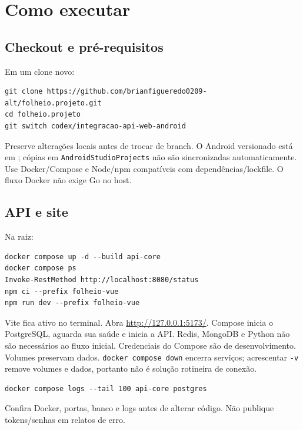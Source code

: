 \documentclass[11pt,a4paper]{article}
\newcommand{\arquivo}[1]{\path{#1}}
\begin{document}
\section{Como executar}\label{sec:executar}
\subsection{Checkout e pré-requisitos}
Em um clone novo:
\begin{lstlisting}
git clone https://github.com/brianfigueredo0209-alt/folheio.projeto.git
cd folheio.projeto
git switch codex/integracao-api-web-android
\end{lstlisting}
Preserve alterações locais antes de trocar de branch. O Android versionado está em \arquivo{folheio-android/}; cópias em \texttt{AndroidStudioProjects} não são sincronizadas automaticamente.
Use Docker/Compose e Node/npm compatíveis com dependências/lockfile. O fluxo Docker não exige Go no host.
\subsection{API e site}
Na raiz:
\begin{lstlisting}
docker compose up -d --build api-core
docker compose ps
Invoke-RestMethod http://localhost:8080/status
npm ci --prefix folheio-vue
npm run dev --prefix folheio-vue
\end{lstlisting}
Vite fica ativo no terminal. Abra \url{http://127.0.0.1:5173/}. Compose inicia o PostgreSQL, aguarda sua saúde e inicia a API. Redis, MongoDB e Python não são necessários ao fluxo inicial.
Credenciais do Compose são de desenvolvimento. Volumes preservam dados. \texttt{docker compose down} encerra serviços; acrescentar \texttt{-v} remove volumes e dados, portanto não é solução rotineira de conexão.
\begin{lstlisting}
docker compose logs --tail 100 api-core postgres
\end{lstlisting}
Confira Docker, portas, banco e logs antes de alterar código. Não publique tokens/senhas em relatos de erro.
\end{document}
